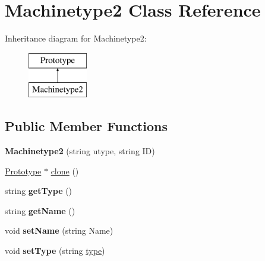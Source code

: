 \hypertarget{classMachinetype2}{}\section{Machinetype2 Class Reference}
\label{classMachinetype2}
Inheritance diagram for Machinetype2\+:\begin{figure}[H]
\begin{center}
\leavevmode
\includegraphics[height=2.000000cm]{classMachinetype2}
\end{center}
\end{figure}
\subsection*{Public Member Functions}
\begin{DoxyCompactItemize}
\item 
{\bfseries Machinetype2} (string utype, string ID)\hypertarget{classMachinetype2_ae858e194de2a36f88ae70cde70208829}{}\label{classMachinetype2_ae858e194de2a36f88ae70cde70208829}

\item 
\hyperlink{classPrototype}{Prototype} $\ast$ \hyperlink{classMachinetype2_a90dbc90692c2890c1afb2b5ff130987b}{clone} ()
\item 
string {\bfseries get\+Type} ()\hypertarget{classMachinetype2_a866af4748f21efcc111ab6d674e689f4}{}\label{classMachinetype2_a866af4748f21efcc111ab6d674e689f4}

\item 
string {\bfseries get\+Name} ()\hypertarget{classMachinetype2_ab1330110821d06d6947f976c3fa47c8c}{}\label{classMachinetype2_ab1330110821d06d6947f976c3fa47c8c}

\item 
void {\bfseries set\+Name} (string Name)\hypertarget{classMachinetype2_aca1fc24b86786ba7f55e6d8b590bd4f2}{}\label{classMachinetype2_aca1fc24b86786ba7f55e6d8b590bd4f2}

\item 
void {\bfseries set\+Type} (string \hyperlink{classPrototype_a2d6c59c7f19020c5c66bb1902d858992}{type})\hypertarget{classMachinetype2_a8992165a2de7596fefc6b9b1e96f79ce}{}\label{classMachinetype2_a8992165a2de7596fefc6b9b1e96f79ce}

\end{DoxyCompactItemize}
